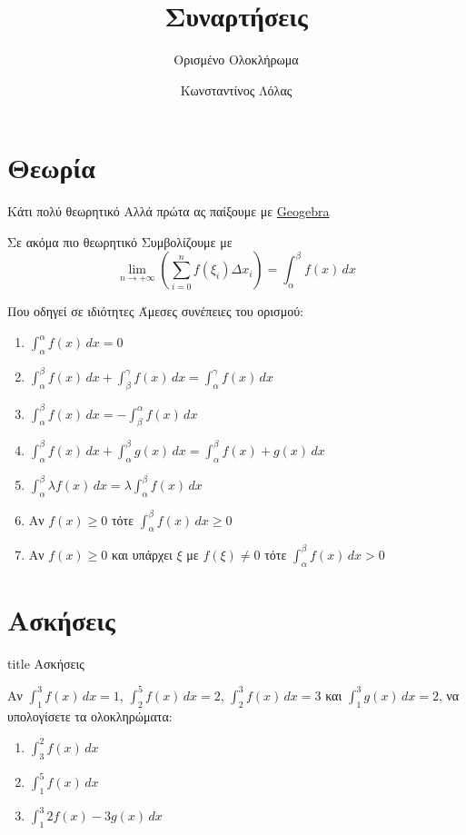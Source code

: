 \documentclass{presentation}
\title{Συναρτήσεις}
\subtitle{Ορισμένο Ολοκλήρωμα}
\author[Λόλας]{Κωνσταντίνος Λόλας}
\begin{document}
\begin{frame}
  \titlepage
\end{frame}

\section{Θεωρία}
\begin{frame}{Κάτι πολύ θεωρητικό}
  Αλλά πρώτα ας παίξουμε με \href{https://www.geogebra.org/classic/asyjagxx}{Geogebra}
\end{frame}

\begin{frame}{Σε ακόμα πιο θεωρητικό}
  Συμβολίζουμε με
  $$\lim_{n\to +\infty}\left( {\sum_{i=0}^{n}f(ξ_i)Δx_i} \right)=\int_α^β f(x)\,dx $$
\end{frame}

\begin{frame}{Που οδηγεί σε ιδιότητες}
  Άμεσες συνέπειες του ορισμού:
  \begin{enumerate}[<+->]
    \item $\int_α^α f(x)\,dx =0$
    \item $\int_α^β f(x)\,dx + \int_β^γ f(x)\,dx =\int_α^γ f(x)\,dx $
    \item $\int_α^β f(x)\,dx = -\int_β^α f(x)\,dx$
    \item $\int_α^β f(x)\,dx + \int_α^β g(x)\,dx =\int_α^β f(x)+g(x)\,dx $
    \item $\int_α^β λf(x)\,dx =λ \int_α^β f(x)\,dx$
    \item Αν $f(x)\ge 0$ τότε $\int_α^β f(x)\,dx \ge 0$
    \item Αν $f(x)\ge 0$ και υπάρχει $ξ$ με $f(ξ)\ne 0$ τότε $\int_α^β f(x)\,dx > 0$
  \end{enumerate}
\end{frame}


\section{Ασκήσεις}

\begin{frame}[noframenumbering]
  \vfill
  \centering
  \begin{beamercolorbox}[sep=8pt,center,shadow=true,rounded=true]{title}
    Ασκήσεις
  \end{beamercolorbox}
  \vfill
\end{frame}

\begin{askisi}
  Αν $\int_{1}^{3}f(x)\,dx=1$, $\int_{2}^{5}f(x)\,dx=2$, $\int_{2}^{3}f(x)\,dx=3$ και $\int_{1}^{3}g(x)\,dx=2$, να υπολογίσετε τα ολοκληρώματα:
  \begin{enumerate}[<+->]
    \item $\int_{3}^{2}f(x)\,dx$
    \item $\int_{1}^{5}f(x)\,dx$
    \item $\int_{1}^{3}2f(x)-3g(x)\,dx$
  \end{enumerate}
\end{askisi}
\end{document}
